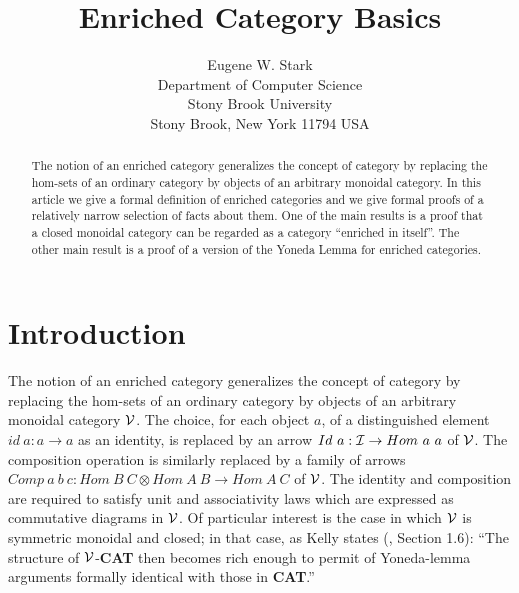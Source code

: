 \documentclass[11pt,notitlepage,a4paper]{report}
\begin{document}
\title{Enriched Category Basics}
\author{Eugene W. Stark\\[\medskipamount]
        Department of Computer Science\\
        Stony Brook University\\
        Stony Brook, New York 11794 USA}
\maketitle

\begin{abstract}
The notion of an enriched category generalizes the concept of category by replacing the hom-sets
of an ordinary category by objects of an arbitrary monoidal category.
In this article we give a formal definition of enriched categories and we give formal proofs
of a relatively narrow selection of facts about them.
One of the main results is a proof that a closed monoidal category can be regarded as a
category ``enriched in itself''.
The other main result is a proof of a version of the Yoneda Lemma for enriched categories.
\end{abstract}

\newpage

{}
\tableofcontents

{}
\chapter*{Introduction}

The notion of an enriched category \cite{kelly-enriched-category}
generalizes the concept of category by replacing the hom-sets of an ordinary category by
objects of an arbitrary monoidal category ${\cal V}$.
The choice, for each object $a$, of a distinguished element $id~a : a \rightarrow a$
as an identity, is replaced by an arrow $Id~a : {\cal I} \rightarrow Hom~a~a$ of ${\cal V}$.
The composition operation is similarly replaced by a family of arrows
$Comp~a~b~c : Hom~B~C \otimes Hom~A~B \rightarrow Hom~A~C$ of ${\cal V}$.
The identity and composition are required to satisfy unit and associativity laws which are
expressed as commutative diagrams in ${\cal V}$.
Of particular interest is the case in which ${\cal V}$ is symmetric monoidal and closed;
in that case, as Kelly states (\cite{kelly-enriched-category}, Section 1.6):
 ``The structure of ${\cal V}$-{\bf CAT} then becomes rich enough to permit of Yoneda-lemma
arguments formally identical with those in {\bf CAT}.''
\end{document}
